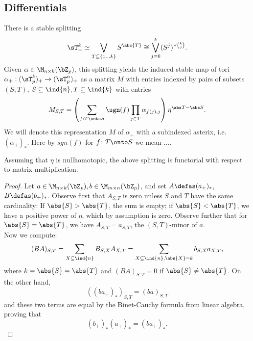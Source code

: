   \subsection{Differentials}
    \begin{lem}\label{lem_decomp_matrix}\cite[Remark 3.2]{carlsson2011higher}
      There is a stable splitting %
      $$\sT_+^k \simeq \bigvee_{T \subseteq \{1 \ldots k \} } S^{\abs{T}} \cong %
      \bigvee_{j = 0}^k (S^j)^{\vee\binom{k}{j}}.$$
      \comm{[geometric torus $(=\bR^n/\bZ^n)$? fix notation! - is $(\bR^n/\bZ^n)_p \simeq  (\bR_p^n/\bZ_p^n)$?} Given $\alpha \in \M_{n \times k}(\bZ_p),$ this splitting yields the induced stable map of tori
      $\alpha_+: (\sT^k_p)_+ \to (\sT^n_p)_+$ as a matrix $M$ with entries indexed by pairs of subsets
      $(S,T)$, $S \subseteq \ind{n}, T \subseteq \ind{k}$ with entries%
      $$ M_{S,T} = \left( \sum_{f:T \onto S} \sgn(f) \prod_{j \in T} \alpha_{f(j),j} \right) \eta^{\abs T - \abs S}.$$
      We will denote this representation $M$ of $\alpha_+$ with a subindexed asterix, i.e. $(\alpha_+)_*$.%
      Here by $sgn(f)$ for $f \colon T \onto S$ we mean .... 
    \end{lem}
    \begin{lem}\label{lem_decomp_matrix_funct}
      Assuming that $\eta$ is nullhomotopic, the above splitting is functorial with respect to matrix multiplication.
      \begin{proof}
        Let $a \in \M_{n \times k}(\bZ_p), b \in \M_{m \times n}(\bZ_p)$, and
        set $A \defas (a_+)_*$, $B \defas (b_+)_*$. Observe first that $A_{S,T}$
        is zero unless $S$ and $T$ have the same cardinality: If $\abs{S} >
        \abs{T}$, the sum is empty; if $\abs{S} < \abs{T}$, we have a positive
        power of $\eta$, which by assumption is zero. Observe further that for
        $\abs{S} = \abs{T}$, we have $A_{S,T} = a_{S,T}$, the $(S,T)$-minor of
        $a$.\\
        Now we compute:
        $$(BA)_{S,T} = \sum_{X \subseteq \ind{n}} B_{S,X} A_{X,T} = %
        \sum_{X
        \subseteq \ind{n}, \abs{X} = k} b_{S,X} a_{X,T},$$
        where $k = \abs{S} = \abs{T}$ and $(BA)_{S,T} = 0$ if $\abs{S} \neq \abs{T}$. On the other hand,
        $$((ba_+)_*)_{S,T} = (ba)_{S,T}$$ and these two terms are equal by the Binet-Cauchy formula from linear algebra, proving that%
        $$ (b_+)_*(a_+)_* = (ba_+)_*.$$
      \end{proof}
    \end{lem}

